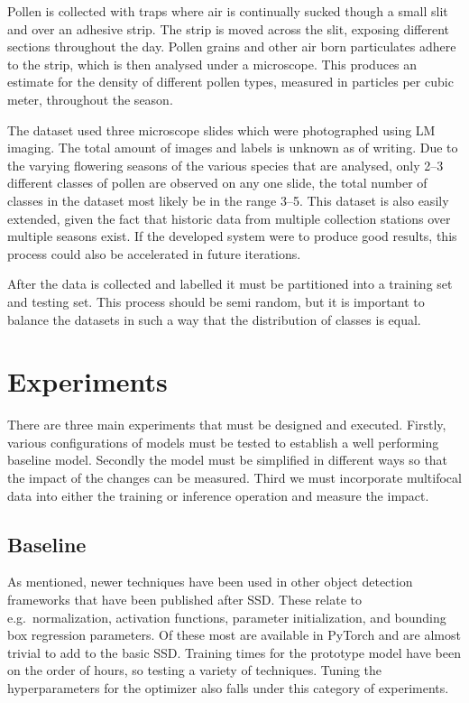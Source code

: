 Pollen is collected with traps where air is continually sucked though a small slit and over an adhesive strip.
The strip is moved across the slit, exposing different sections throughout the day.
Pollen grains and other air born particulates adhere to the strip, which is then analysed under a microscope.
This produces an estimate for the density of different pollen types, measured in particles per cubic meter, throughout the season. 

The dataset used three microscope slides which were photographed using LM imaging.
The total amount of images and labels is unknown as of writing.
Due to the varying flowering seasons of the various species that are analysed, only 2--3 different classes of pollen are observed on any one slide, the total number of classes in the dataset most likely be in the range 3--5.
This dataset is also easily extended, given the fact that historic data from multiple collection stations over multiple seasons exist.
If the developed system were to produce good results, this process could also be accelerated in future iterations.

After the data is collected and labelled it must be partitioned into a training set and testing set.
This process should be semi random, but it is important to balance the datasets in such a way that the distribution of classes is equal.

\section{Experiments}
There are three main experiments that must be designed and executed.
Firstly, various configurations of models must be tested to establish a well performing baseline model.
Secondly the model must be simplified in different ways so that the impact of the changes can be measured.
Third we must incorporate multifocal data into either the training or inference operation and measure the impact.

\subsection{Baseline}
As mentioned, newer techniques have been used in other object detection frameworks that have been published after SSD\@.
These relate to e.g.\ normalization, activation functions, parameter initialization, and bounding box regression parameters.
Of these most are available in PyTorch and are almost trivial to add to the basic SSD\@.
Training times for the prototype model have been on the order of hours, so testing a variety of techniques.
Tuning the hyperparameters for the optimizer also falls under this category of experiments.

